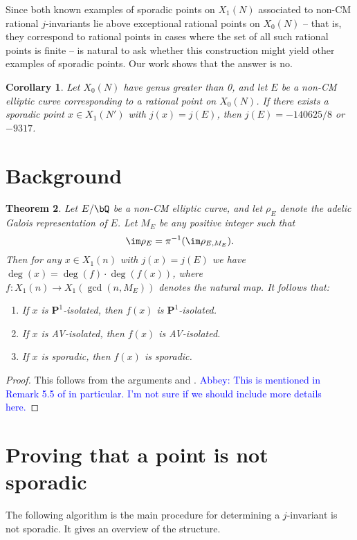 \documentclass[11pt,reqno]{amsart}
\theoremstyle{plain}
\newtheorem{theorem}{Theorem}%
\newtheorem{corollary}[theorem]{Corollary}
\theoremstyle{definition}
\newcommand{\Q}{\bQ}
\newcommand{\abbey}[1]{\textcolor{blue}{Abbey: #1}}
\begin{document}
Since both known examples of sporadic points on $X_1(N)$ associated to non-CM rational $j$-invariants lie above exceptional rational points on $X_0(N)$ -- that is, they correspond to rational points in cases where the set of all such rational points is finite -- is natural to ask whether this construction might yield other examples of sporadic points. Our work shows that the answer is no.
\begin{corollary}
Let $X_0(N)$ have genus greater than 0, and let $E$ be a non-CM elliptic curve corresponding to a rational point on $X_0(N)$. If there exists a sporadic point $x \in X_1(N')$ with $j(x)=j(E)$, then $j(E) =-140625/8$ or $-9317$.
\end{corollary}

\section{Background}

\begin{theorem}
Let $E/\Q$ be a non-CM elliptic curve, and let $\rho_E$ denote the adelic Galois representation of $E$. Let $M_E$ be any positive integer such that
\[
\im \rho_E=\pi^{-1}(\im \rho_{E, M_E}).
\]
Then for any $x \in X_1(n)$ with $j(x)=j(E)$ we have $\deg(x)=\deg(f)\cdot \deg(f(x))$, where $f: X_1(n) \rightarrow X_1(\gcd(n,M_E))$ denotes the natural map. It follows that:
\begin{enumerate}
\item If $x$ is $\mathbf{P}^1$-isolated, then $f(x)$ is $\mathbf{P}^1$-isolated.
\item If $x$ is AV-isolated, then $f(x)$ is AV-isolated.
\item If $x$ is sporadic, then $f(x)$ is sporadic.
\end{enumerate}
\end{theorem}

\begin{proof}
This follows from the arguments \cite[$\S5.3$]{BELOV} and \cite[Theorem 4.3]{BELOV}. \abbey{This is mentioned in Remark 5.5 of \cite{BELOV} in particular. I'm not sure if we should include more details here.}
\end{proof}

\section{Proving that a point is not sporadic}
The following algorithm is the main procedure for determining a $j$-invariant is not sporadic. It gives an overview of the structure.
\end{document}
